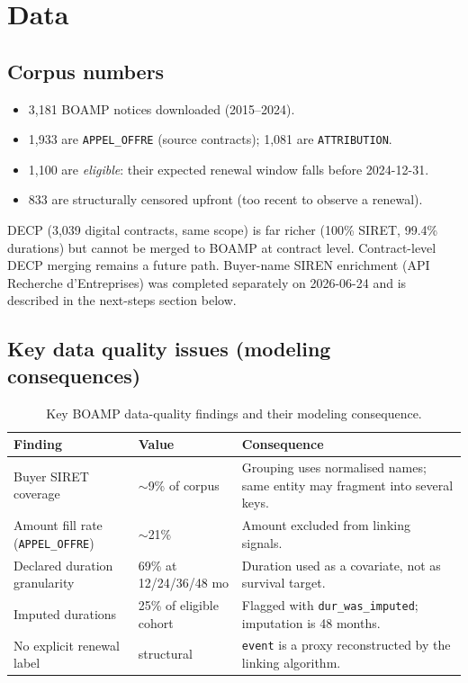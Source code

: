 \documentclass[11pt,a4paper]{article}
\begin{document}
\section{Data}
\label{sec:data}

\subsection{Corpus numbers}
\begin{itemize}[leftmargin=1.4em,itemsep=1pt]
  \item 3,181 BOAMP notices downloaded (2015--2024).
  \item 1,933 are \texttt{APPEL\_OFFRE} (source contracts); 1,081 are \texttt{ATTRIBUTION}.
  \item 1,100 are \emph{eligible}: their expected renewal window falls before 2024-12-31.
  \item 833 are structurally censored upfront (too recent to observe a renewal).
\end{itemize}

DECP (3,039 digital contracts, same scope) is far richer (100\% SIRET,
99.4\% durations) but cannot be merged to BOAMP at contract level.
Contract-level DECP merging remains a future path.
Buyer-name SIREN enrichment (API Recherche d'Entreprises) was completed separately
on 2026-06-24 and is described in the next-steps section below.

\subsection{Key data quality issues (modeling consequences)}

\begin{table}[H]
\centering
\caption{Key BOAMP data-quality findings and their modeling consequence.}
\label{tab:dq}
\small
\begin{tabular}{@{}p{4.8cm}p{2.8cm}p{6.0cm}@{}}
\toprule
\textbf{Finding} & \textbf{Value} & \textbf{Consequence} \\
\midrule
Buyer SIRET coverage & $\sim$9\% of corpus & Grouping uses normalised names; same entity may fragment into several keys. \\
Amount fill rate (\texttt{APPEL\_OFFRE}) & $\sim$21\% & Amount excluded from linking signals. \\
Declared duration granularity & 69\% at 12/24/36/48 mo & Duration used as a covariate, not as survival target. \\
Imputed durations & 25\% of eligible cohort & Flagged with \texttt{dur\_was\_imputed}; imputation is 48 months. \\
No explicit renewal label & structural & \texttt{event} is a proxy reconstructed by the linking algorithm. \\
\bottomrule
\end{tabular}
\end{table}
\end{document}
